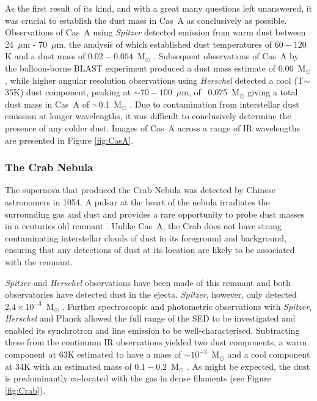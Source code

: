 
As the first result of its kind, and with a great many questions left unanswered, it was crucial to establish the dust mass in Cas~A as conclusively as possible.   Observations of Cas~A using \textit{Spitzer} detected emission from warm dust between 24~$\mu$m - 70~$\mu$m, the analysis of which established dust temperatures of $60 - 120$K and a dust mass of $0.02 - 0.054$~M$_{\odot}$ \citep{Rho2008}.  Subsequent observations of Cas~A by the balloon-borne BLAST experiment \citep{Sibthorpe2010} produced a dust mass estimate of 0.06~M$_{\odot}$, while higher angular resolution observations using \textit{Herschel} detected a cool (T$\sim$35K) dust component, peaking at $\sim70-100$~$\mu$m, of ~0.075~M$_{\odot}$ giving a total dust mass in Cas~A of $\sim$0.1~M$_{\odot}$ \citep{Barlow2010}.  Due to contamination from interstellar dust emission at longer wavelengths, it was difficult to conclusively determine the presence of any colder dust.  Images of Cas~A across a range of IR wavelengths are presented in Figure \ref{fig:CasA}.  

\subsubsection{The Crab Nebula}

The supernova that produced the Crab Nebula was detected by Chinese astronomers in 1054.  A pulsar at the heart of the nebula irradiates the surrounding gas and dust and provides a rare opportunity to probe dust masses in a centuries old remnant \citep{CrabPulsar}.  Unlike Cas~A, the Crab does not have strong contaminating interstellar clouds of dust in its foreground and background, ensuring that any detections of dust at its location are likely to be associated with the remnant.
 
\textit{Spitzer} and \textit{Herschel} observations have been made of this remnant and both observatories have detected dust in the ejecta.  {\em Spitzer}, however, only detected $2.4\times10^{-3}$~M$_{\odot}$ \citep{Temim2012}.  Further spectroscopic and photometric observations with {\em Spitzer}, {\em Herschel} and Planck allowed the full range of the SED to be investigated and enabled its synchrotron and line emission to be well-characterised.  Subtracting these from the continuum IR observations yielded two dust components, a warm component at 63K estimated to have a mass of $\sim10^{-3}$~M$_{\odot}$ and a cool component at  34K with an estimated mass of $0.1 - 0.2$~M$_{\odot}$ \citep{Gomez2012}.  As might be expected, the dust is predominantly co-located with the gas in dense filaments (see Figure \ref{fig:Crab}).
 
